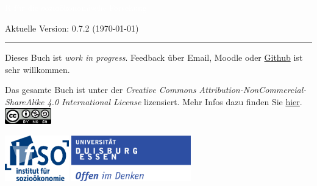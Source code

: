 \documentclass[letterpaper]{article}
\author{%
    Dr. Claudius Gr\"abner \\
    Institut f\"ur Sozio\"okonomie \\
    Universit\"at Duisburg-Essen\\
    \href{mailto:claudius.graebner@uni-due.com}{claudius.graebner@uni-due.com}\\
    \href{www.claudius-graebner.com}{https://claudius-graebner.com/}
    }
\makeatletter
\def\printauthor{%
    {\large \@author}}
\makeatother
\begin{document}
\begin{titlepage}
\BgThispage
{}
\vspace*{2cm}
\noindent
\onehalfspacing
\textcolor{white}{\bigsf R f\"ur die \mbox{sozio\"okonomische} Forschung}
\vspace*{1.2cm}\par
Aktuelle Version: 0.7.2 (\today)\\
\vspace*{2.0cm}\par
\noindent
\begin{minipage}{0.35\linewidth}
    \begin{flushright}
        \printauthor
    \end{flushright}
\end{minipage} \hspace{15pt}
%
\begin{minipage}{0.02\linewidth}
    \rule{1pt}{175pt}
\end{minipage} \hspace{-10pt}
%
\begin{minipage}{0.6\linewidth}
\vspace{5pt}
\begin{adjustwidth}{25pt}{25pt}
\raggedright
Dieses Buch ist \textit{work in progress}.
Feedback \"uber Email, Moodle oder
\href{https://github.com/graebnerc/RforSocioEcon}{Github} ist
sehr willkommen.

Das gesamte Buch ist unter der 
\textit{Creative Commons Attribution-NonCommercial-ShareAlike 4.0 International License} lizensiert. 
Mehr Infos dazu finden Sie \href{https://creativecommons.org/licenses/by-nc-sa/4.0/}{hier}.\\
\vspace{0.5cm}
\includegraphics[width=2cm]{license.png}
\end{adjustwidth}

\end{minipage}

\vspace{0.25cm}
\centering
\vspace{1.25cm}
\vfill
\includegraphics[height=2cm]{ifso_logo_dt_RGB} \hspace{2cm}
\includegraphics[height=2cm]{logo_ude.pdf}
\end{titlepage}
\end{document}
